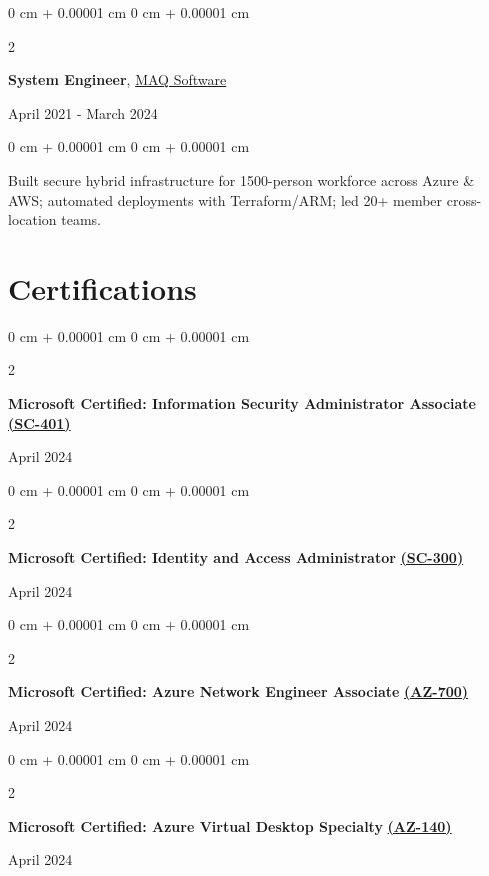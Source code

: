 \documentclass[10pt, letterpaper]{article}
\newenvironment{onecolentry}{
    \begin{adjustwidth}{
        0 cm + 0.00001 cm
    }{
        0 cm + 0.00001 cm
    }
}{
    \end{adjustwidth}
}
\newenvironment{twocolentry}[2][]{
    \onecolentry
    \def\secondColumn{#2}
    \setcolumnwidth{\fill, 4.5 cm}
    \begin{paracol}{2}
}{
    \switchcolumn \raggedleft \secondColumn
    \end{paracol}
    \endonecolentry
}
\begin{document}
\vspace{0.2 cm}

\begin{twocolentry}{April 2021 - March 2024}
    \textbf{System Engineer}, \href{https://maqsoftware.com/}{MAQ Software}
\end{twocolentry}

\vspace{0.10 cm}
\begin{onecolentry}
    Built secure hybrid infrastructure for 1500-person workforce across Azure \& AWS; automated deployments with Terraform/ARM; led 20+ member cross-location teams.
\end{onecolentry}

\section{Certifications}

\vspace{0.2 cm}

\begin{twocolentry}{April 2024}
    \textbf{Microsoft Certified: Information Security Administrator Associate} \href{https://learn.microsoft.com/api/credentials/share/en-in/ChinmayDhokMAQSoftware-5822/175A9EF2AB5B5B56?sharingId=BC2982D57159EF1A}{\textbf{(SC-401)}}
\end{twocolentry}

\vspace{0.05 cm}
\begin{twocolentry}{April 2024}
    \textbf{Microsoft Certified: Identity and Access Administrator} \href{https://learn.microsoft.com/en-us/users/chinmaydhokmaqsoftware-5822/credentials/82be0c3d23d052b8}{\textbf{(SC-300)}}
\end{twocolentry}

\vspace{0.05 cm}
\begin{twocolentry}{April 2024}
    \textbf{Microsoft Certified: Azure Network Engineer Associate} \href{https://learn.microsoft.com/en-us/users/ChinmayDhokMAQSoftware-5822/credentials/4244163FEBBEDDAF}{\textbf{(AZ-700)}}
\end{twocolentry}

\vspace{0.05 cm}
\begin{twocolentry}{April 2024}
    \textbf{Microsoft Certified: Azure Virtual Desktop Specialty} \href{https://learn.microsoft.com/en-us/users/chinmaydhokmaqsoftware-5822/credentials/ccf1857230b93a53}{\textbf{(AZ-140)}}
\end{twocolentry}
\end{document}
